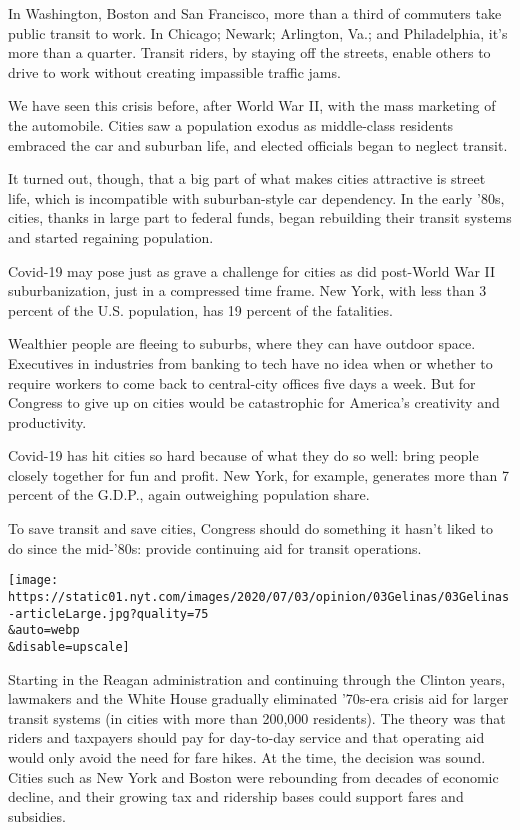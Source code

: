 In Washington, Boston and San Francisco, more than a third of commuters
take public transit to work. In Chicago; Newark; Arlington, Va.; and
Philadelphia, it's more than a quarter. Transit riders, by staying off
the streets, enable others to drive to work without creating impassible
traffic jams.

We have seen this crisis before, after World War II, with the mass
marketing of the automobile. Cities saw a population exodus as
middle-class residents embraced the car and suburban life, and elected
officials began to neglect transit.

It turned out, though, that a big part of what makes cities attractive
is street life, which is incompatible with suburban-style car
dependency. In the early '80s, cities, thanks in large part to federal
funds, began rebuilding their transit systems and started regaining
population.

Covid-19 may pose just as grave a challenge for cities as did post-World
War II suburbanization, just in a compressed time frame. New York, with
less than 3 percent of the U.S. population, has 19 percent of the
fatalities.

Wealthier people are fleeing to suburbs, where they can have outdoor
space. Executives in industries from banking to tech have no idea when
or whether to require workers to come back to central-city offices five
days a week. But for Congress to give up on cities would be catastrophic
for America's creativity and productivity.

Covid-19 has hit cities so hard because of what they do so well: bring
people closely together for fun and profit. New York, for example,
generates more than 7 percent of the G.D.P., again outweighing
population share.

To save transit and save cities, Congress should do something it hasn't
liked to do since the mid-'80s: provide continuing aid for transit
operations.

\texttt{[image: https://static01.nyt.com/images/2020/07/03/opinion/03Gelinas/03Gelinas-articleLarge.jpg?quality=75\\\&auto=webp\\\&disable=upscale]}

Starting in the Reagan administration and continuing through the Clinton
years, lawmakers and the White House gradually eliminated '70s-era
crisis aid for larger transit systems (in cities with more than 200,000
residents). The theory was that riders and taxpayers should pay for
day-to-day service and that operating aid would only avoid the need for
fare hikes. At the time, the decision was sound. Cities such as New York
and Boston were rebounding from decades of economic decline, and their
growing tax and ridership bases could support fares and subsidies.


